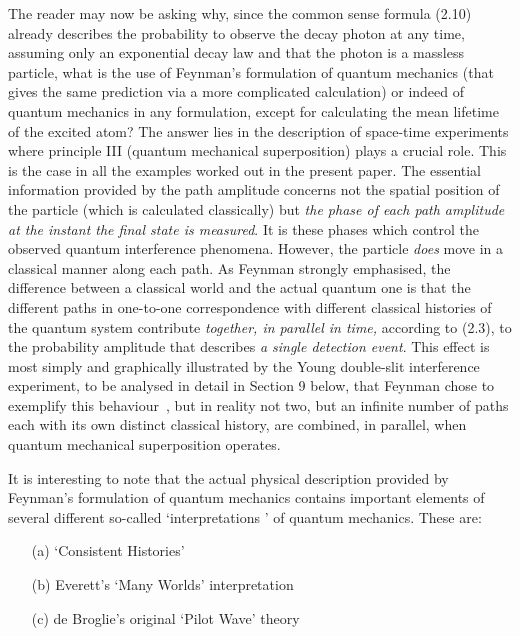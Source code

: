 {    \par The reader may now be asking why, since the common sense formula (2.10) already
    describes the probability to observe the decay photon at any time, assuming only an
    exponential decay law and that the photon is a massless particle, what is the use of
    Feynman's formulation of quantum mechanics (that gives the same prediction via 
    a more complicated calculation) or indeed of 
    quantum mechanics in any formulation, except for calculating the mean lifetime of the 
    excited atom? The answer lies in the description of space-time experiments where
    principle III (quantum mechanical superposition) plays a crucial role. This is  the 
    case in all the examples worked out in the present paper. The essential information
    provided by the path amplitude concerns not the spatial position of the particle
    (which is calculated classically) but {\it the phase of each path amplitude
    at the instant the final state is measured}. It is these phases which control
    the observed quantum interference phenomena. However, the particle {\it does} move in a classical
    manner along each path. As Feynman strongly emphasised, the difference
    between a classical world and the actual quantum one is that the different paths
    in one-to-one correspondence with different classical histories of the quantum 
    system contribute {\it together, in parallel in time,} according to (2.3), to the
    probability amplitude that describes {\it a single detection  event}. This effect is most
    simply and graphically illustrated by the Young double-slit interference
    experiment, to be analysed in detail in Section 9 below, that Feynman chose to
     exemplify this behaviour~\cite{Feyn7}, but in reality
    not two, but an infinite number of paths each with its own distinct classical
    history, are combined, in parallel, when quantum mechanical superposition operates.
    \par It is interesting to note that the actual physical description provided by Feynman's
    formulation of quantum mechanics contains important elements of several different so-called
   `interpretations ' of quantum mechanics. These are:
    \begin{itemize}
   \item[(a)] `Consistent Histories'
   \item[(b)] Everett's `Many Worlds' interpretation
   \item[(c)] de Broglie's original `Pilot Wave' theory
   \end{itemize}
}
